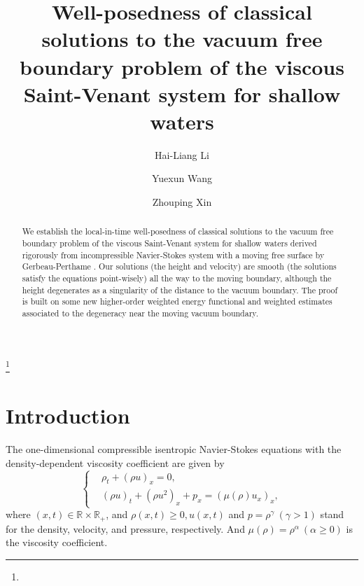 \documentclass[11pt, reqno]{amsart}
\numberwithin{equation}{section}
\begin{document}
\title[the viscous Saint-Venant system
for shallow waters]{Well-posedness of classical solutions to the vacuum free boundary
problem of the viscous Saint-Venant system
for shallow waters}

\author{Hai-Liang Li}

\author{Yuexun Wang}

\author{Zhouping Xin}

\address{ School of Mathematics and CIT, Capital Normal University, Beijing 100048, P. R. China.}


\address{	
	School of Mathematics and Statistics,
	Lanzhou University, 730000 Lanzhou, China.}



\address{The Institute of Mathematical Sciences, The Chinese University of Hong Kong, Hong Kong}


\thanks{}



\begin{abstract} We establish the local-in-time well-posedness of classical solutions to the vacuum free boundary
problem of the viscous Saint-Venant system
for shallow waters derived rigorously from incompressible
Navier-Stokes system with a moving free surface by Gerbeau-Perthame \cite{MR1821555}. Our solutions (the height and velocity) are smooth (the solutions satisfy the equations point-wisely) all the way to the moving boundary, although the height degenerates as a singularity of the distance to the vacuum boundary. The proof is built on some new higher-order weighted energy functional and weighted estimates associated to the degeneracy near the moving vacuum boundary.
\end{abstract}
\maketitle



\section{Introduction }

The one-dimensional compressible isentropic Navier-Stokes equations with the density-dependent
viscosity coefficient are given by
\begin{equation}\label{eq:intro-1}
	\left\{
	\begin{aligned}
		&\rho_t+(\rho u)_x=0,\\
		&(\rho u)_t+(\rho u^2)_x+p_x
=(\mu(\rho)u_x)_x,
	\end{aligned}
	\right.
\end{equation}
where $(x,t)\in\mathbb{R}\times\mathbb{R}_+ $, and $\rho(x,t)\geq 0,u(x,t)$ and $p=\rho^\gamma\ (\gamma>1)$ stand for the  density, velocity, and pressure, respectively. And $\mu(\rho)=\rho^\alpha\ (\alpha\geq 0)$ is the viscosity coefficient.
\end{document}
